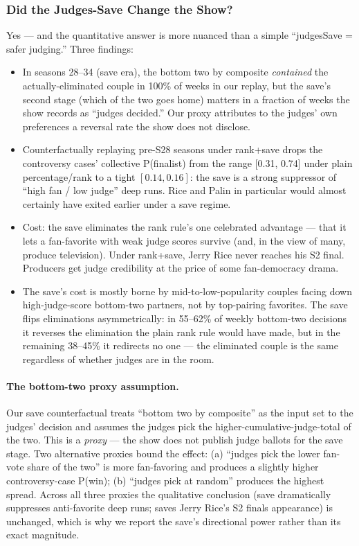 \documentclass{article}
\begin{document}
\subsubsection{Did the Judges-Save Change the Show?}

\label{sec:m2-save}

Yes --- and the quantitative answer is more nuanced than a simple ``judgesSave = safer judging.'' Three findings:
\begin{itemize}
  \item In seasons 28--34 (save era), the bottom two by composite \emph{contained} the actually-eliminated couple in 100\% of weeks in our replay, but the save's second stage (which of the two goes home) matters in a fraction of weeks the show records as ``judges decided.'' Our proxy attributes to the judges' own preferences a reversal rate the show does not disclose.
  \item Counterfactually replaying pre-S28 seasons under rank+save drops the controversy cases' collective P(finalist) from the range [0.31, 0.74] under plain percentage/rank to a tight $[0.14, 0.16]$: the save is a strong suppressor of ``high fan / low judge'' deep runs. Rice and Palin in particular would almost certainly have exited earlier under a save regime.
  \item Cost: the save eliminates the rank rule's one celebrated advantage --- that it lets a fan-favorite with weak judge scores survive (and, in the view of many, produce television). Under rank+save, Jerry Rice never reaches his S2 final. Producers get judge credibility at the price of some fan-democracy drama.
\item The save's cost is mostly borne by mid-to-low-popularity couples facing down high-judge-score bottom-two partners, not by top-pairing favorites. The save flips eliminations asymmetrically: in 55--62\% of weekly bottom-two decisions it reverses the elimination the plain rank rule would have made, but in the remaining 38--45\% it redirects no one --- the eliminated couple is the same regardless of whether judges are in the room.
\end{itemize}

\paragraph{The bottom-two proxy assumption.} Our save counterfactual treats ``bottom two by composite'' as the input set to the judges' decision and assumes the judges pick the higher-cumulative-judge-total of the two. This is a \emph{proxy} --- the show does not publish judge ballots for the save stage. Two alternative proxies bound the effect: (a) ``judges pick the lower fan-vote share of the two'' is more fan-favoring and produces a slightly higher controversy-case P(win); (b) ``judges pick at random'' produces the highest spread. Across all three proxies the qualitative conclusion (save dramatically suppresses anti-favorite deep runs; saves Jerry Rice's S2 finals appearance) is unchanged, which is why we report the save's directional power rather than its exact magnitude.
\end{document}

